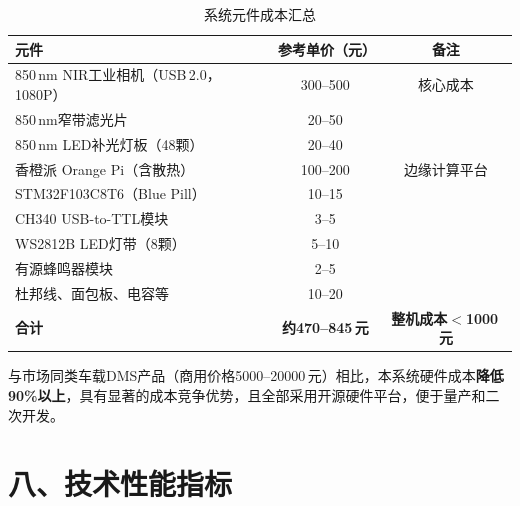 \documentclass[a4paper,12pt]{article}
\begin{document}
\begin{table}[H]
  \centering
  \caption{系统元件成本汇总}
  \renewcommand{\arraystretch}{1.3}
  \begin{tabular}{|p{5cm}|c|c|}
    \hline
    \textbf{元件} & \textbf{参考单价（元）} & \textbf{备注}\\
    \hline
    850\,nm NIR工业相机（USB\,2.0，1080P）& 300--500 & 核心成本\\
    \hline
    850\,nm窄带滤光片 & 20--50 & \\
    \hline
    850\,nm LED补光灯板（48颗）& 20--40 & \\
    \hline
    香橙派 Orange Pi（含散热）& 100--200 & 边缘计算平台\\
    \hline
    STM32F103C8T6（Blue Pill）& 10--15 & \\
    \hline
    CH340 USB-to-TTL模块 & 3--5 & \\
    \hline
    WS2812B LED灯带（8颗）& 5--10 & \\
    \hline
    有源蜂鸣器模块 & 2--5 & \\
    \hline
    杜邦线、面包板、电容等 & 10--20 & \\
    \hline
    \textbf{合计} & \textbf{约470--845\,元} & \textbf{整机成本$<$1000\,元}\\
    \hline
  \end{tabular}
\end{table}

与市场同类车载DMS产品（商用价格5000--20000\,元）相比，本系统硬件成本\textbf{降低
90\%以上}，具有显著的成本竞争优势，且全部采用开源硬件平台，便于量产和二次开发。

\section*{八、技术性能指标}
\end{document}
